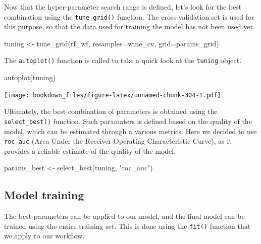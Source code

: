 \documentclass[
]{krantz}
\makeatletter
\newenvironment{Shaded}{\begin{snugshade}}{\end{snugshade}}
\newcommand{\AttributeTok}[1]{\textcolor[rgb]{0.61,0.61,0.61}{#1}}
\newcommand{\FunctionTok}[1]{\textcolor[rgb]{0,0,0}{#1}}
\newcommand{\NormalTok}[1]{#1}
\newcommand{\OtherTok}[1]{\textcolor[rgb]{0.37,0.37,0.37}{#1}}
\newcommand{\StringTok}[1]{\textcolor[rgb]{0.5,0.5,0.5}{#1}}
\newenvironment{kframe}{%
\medskip{}
\setlength{\fboxsep}{.8em}
 \def\at@end@of@kframe{}%
 \ifinner\ifhmode%
  \def\at@end@of@kframe{\end{minipage}}%
  \begin{minipage}{\columnwidth}%
 \fi\fi%
 \def\FrameCommand##1{\hskip\@totalleftmargin \hskip-\fboxsep
 \colorbox{shadecolor}{##1}\hskip-\fboxsep
     \hskip-\linewidth \hskip-\@totalleftmargin \hskip\columnwidth}%
 \MakeFramed {\advance\hsize-\width
   \@totalleftmargin\z@ \linewidth\hsize
   \@setminipage}}%
 {\par\unskip\endMakeFramed%
 \at@end@of@kframe}
\renewenvironment{Shaded}{\begin{kframe}}{\end{kframe}}
\makeatother
\begin{document}
Now that the hyper-parameter search range is defined, let's look for the best combination using the \texttt{tune\_grid()} function. The cross-validation set is used for this purpose, so that the data used for training the model has not been used yet.

\begin{Shaded}
\begin{Highlighting}[]
\NormalTok{tuning }\OtherTok{\textless{}{-}} \FunctionTok{tune\_grid}\NormalTok{(rf\_wf, }\AttributeTok{resamples=}\NormalTok{wine\_cv, }\AttributeTok{grid=}\NormalTok{params\_grid)}
\end{Highlighting}
\end{Shaded}

The \texttt{autoplot()} function is called to take a quick look at the \texttt{tuning} object.

\begin{Shaded}
\begin{Highlighting}[]
\FunctionTok{autoplot}\NormalTok{(tuning)}
\end{Highlighting}
\end{Shaded}

\texttt{[image: bookdown\_files/figure-latex/unnamed-chunk-304-1.pdf]}

Ultimately, the best combination of parameters is obtained using the \texttt{select\_best()} function. Such paramaters is defined based on the quality of the model, which can be estimated through a various metrics. Here we decided to use \texttt{roc\_auc} (Area Under the Receiver Operating Characteristic Curve), as it provides a reliable estimate of the quality of the model.

\begin{Shaded}
\begin{Highlighting}[]
\NormalTok{params\_best }\OtherTok{\textless{}{-}} \FunctionTok{select\_best}\NormalTok{(tuning, }\StringTok{"roc\_auc"}\NormalTok{)}
\end{Highlighting}
\end{Shaded}

\hypertarget{model-training}{%
\subsection{Model training}\label{model-training}}

The best parameters can be applied to our model, and the final model can be trained using the entire training set. This is done using the \texttt{fit()} function that we apply to our workflow.
\end{document}
